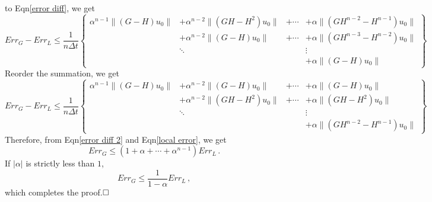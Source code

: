 \documentclass[a4paper,onecolumn]{article}
\theoremstyle{remark}
\begin{document}
\begin{appendices}
    to Eqn\eqref{error diff}, we get
    \begin{equation}
        Err_G - Err_L \le 
        \frac{1}{n\Delta t}
        \left\{\begin{split}
            \alpha^{n-1}\|(G - H)u_0\| &+ \alpha^{n-2}\|(GH - H^2)u_0\|&+\cdots
            &+ \alpha\|(GH^{n-2} - H^{n-1})u_0\|\\
            &+\alpha^{n-2}\|( G - H)u_0\| &+ \cdots 
            &+ \alpha\|(GH^{n-3} - H^{n-2})u_0\|\\
            &\ddots&& \vdots\\
            &&& + \alpha\|(G - H)u_0\|
        \end{split}
        \right\}
        \label{error diff}
    \end{equation}
    Reorder the summation, we get
    \begin{equation}
        Err_G - Err_L \le 
        \frac{1}{n\Delta t}
        \left\{\begin{split}
            \alpha^{n-1}\|(G - H)u_0\| &+ \alpha^{n-2}\|(G - H)u_0\|&+\cdots
            &+ \alpha\|(G - H)u_0\|\\
            &+\alpha^{n-2}\|( GH - H^2)u_0\| &+ \cdots 
            &+ \alpha\|(GH - H^{2})u_0\|\\
            &\ddots&& \vdots\\
            &&& + \alpha\|(GH^{n-2} - H^{n-1})u_0\|
        \end{split}
        \right\}
        \label{error diff 2}
    \end{equation}
    Therefore, from Eqn\eqref{error diff 2} and Eqn\eqref{local error}, we get
    \begin{equation}
        Err_G \le (1+\alpha+\cdots+\alpha^{n-1}) Err_L\,.
    \end{equation}
    If $|\alpha|$ is strictly less than $1$, 
    \begin{equation}
        Err_G \le \frac{1}{1-\alpha} Err_L\,,
    \end{equation}
    which completes the proof.$\hfill\Box$




\end{appendices}
\end{document}
